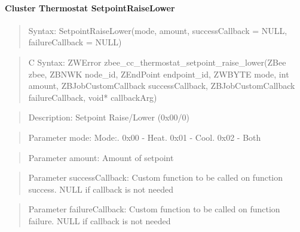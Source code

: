 \paragraph{Cluster Thermostat SetpointRaiseLower}
\begin{quote}Syntax: SetpointRaiseLower(mode, amount, successCallback = NULL, failureCallback = NULL)\end{quote}
\begin{quote}C Syntax: ZWError zbee\_cc\_thermostat\_setpoint\_raise\_lower(ZBee zbee, ZBNWK node\_id, ZEndPoint endpoint\_id, ZWBYTE mode, int amount, ZBJobCustomCallback successCallback, ZBJobCustomCallback failureCallback, void* callbackArg)\end{quote}
\begin{quote}Description: Setpoint Raise/Lower (0x00/0)\end{quote}
\begin{quote}Parameter mode: Mode:. 0x00 - Heat. 0x01 - Cool. 0x02 - Both\end{quote}
\begin{quote}Parameter amount: Amount of setpoint\end{quote}
\begin{quote}Parameter successCallback: Custom function to be called on function success. NULL if callback is not needed\end{quote}
\begin{quote}Parameter failureCallback: Custom function to be called on function failure. NULL if callback is not needed\end{quote}


